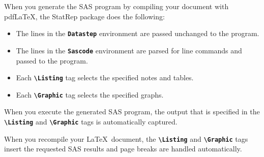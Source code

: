 \documentclass{article}
\newcommand*{\Statrep}{\mbox{\textsf{StatRep}}\xspace}
\newcommand*{\Code}[1]{\texttt{\textbf{#1}}}
\newcommand*{\cs}[1]{\texttt{\textbf{\textbackslash#1}}}
\begin{document}
When you generate
the SAS program by compiling your document with pdf\LaTeX,
the \Statrep package does the following:
\begin{itemize}
\item The lines in the \Code{Datastep} environment are passed unchanged to the program.
\item The lines in the \Code{Sascode} environment are parsed for line commands and passed
to the program.
\item Each \cs{Listing} tag  selects the specified notes and tables.

\item Each \cs{Graphic} tag selects the specified graphs.

\end{itemize}

When you execute the generated SAS program, the output that is
specified in the \cs{Listing} and \cs{Graphic}
tags is automatically captured.

When you recompile your \LaTeX\ document, the \cs{Listing} and \cs{Graphic} tags
insert the requested SAS results and page breaks are handled automatically.
\end{document}
